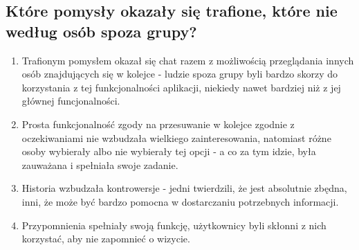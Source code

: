 \documentclass[12pt]{article}
\begin{document}
\subsection{Które pomysły okazały się trafione, które nie według osób spoza grupy?}
\begin{enumerate}
	\item Trafionym pomysłem okazał się chat razem z możliwością przeglądania innych osób znajdujących się w kolejce - ludzie spoza grupy byli bardzo skorzy do korzystania z tej funkcjonalności aplikacji, niekiedy nawet bardziej niż z jej głównej funcjonalności.
	\item Prosta funkcjonalność zgody na przesuwanie w kolejce zgodnie z oczekiwaniami nie wzbudzała wielkiego zainteresowania, natomiast różne osoby wybierały albo nie wybierały tej opcji - a co za tym idzie, była zauważana i spełniała swoje zadanie.
	\item Historia wzbudzała kontrowersje - jedni twierdzili, że jest absolutnie zbędna, inni, że może być bardzo pomocna w dostarczaniu potrzebnych informacji.
	\item Przypomnienia spełniały swoją funkcję, użytkownicy byli skłonni z nich korzystać, aby nie zapomnieć o wizycie.
\end{enumerate}


\clearpage
\end{document}

